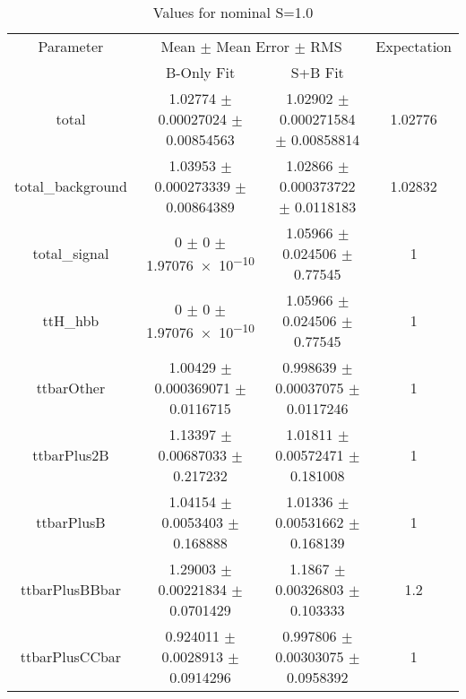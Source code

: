 \begin{table}
\centering
\caption{Values for nominal S=1.0}
\begin{tabular}{cccc}
\toprule
Parameter & \multicolumn{2}{c}{Mean $\pm$ Mean Error $\pm$ RMS} & Expectation\\
 & B-Only Fit & S+B Fit & \\
\midrule
total & \num{1.02774} $\pm$ \num{0.00027024} $\pm$ \num{0.00854563} & \num{1.02902} $\pm$ \num{0.000271584} $\pm$ \num{0.00858814} & \num{1.02776}\\
total\_background & \num{1.03953} $\pm$ \num{0.000273339} $\pm$ \num{0.00864389} & \num{1.02866} $\pm$ \num{0.000373722} $\pm$ \num{0.0118183} & \num{1.02832}\\
total\_signal & \num{0} $\pm$ \num{0} $\pm$ \num{1.97076e-10} & \num{1.05966} $\pm$ \num{0.024506} $\pm$ \num{0.77545} & \num{1}\\
ttH\_hbb & \num{0} $\pm$ \num{0} $\pm$ \num{1.97076e-10} & \num{1.05966} $\pm$ \num{0.024506} $\pm$ \num{0.77545} & \num{1}\\
ttbarOther & \num{1.00429} $\pm$ \num{0.000369071} $\pm$ \num{0.0116715} & \num{0.998639} $\pm$ \num{0.00037075} $\pm$ \num{0.0117246} & \num{1}\\
ttbarPlus2B & \num{1.13397} $\pm$ \num{0.00687033} $\pm$ \num{0.217232} & \num{1.01811} $\pm$ \num{0.00572471} $\pm$ \num{0.181008} & \num{1}\\
ttbarPlusB & \num{1.04154} $\pm$ \num{0.0053403} $\pm$ \num{0.168888} & \num{1.01336} $\pm$ \num{0.00531662} $\pm$ \num{0.168139} & \num{1}\\
ttbarPlusBBbar & \num{1.29003} $\pm$ \num{0.00221834} $\pm$ \num{0.0701429} & \num{1.1867} $\pm$ \num{0.00326803} $\pm$ \num{0.103333} & \num{1.2}\\
ttbarPlusCCbar & \num{0.924011} $\pm$ \num{0.0028913} $\pm$ \num{0.0914296} & \num{0.997806} $\pm$ \num{0.00303075} $\pm$ \num{0.0958392} & \num{1}\\
\bottomrule
\end{tabular}
\end{table}